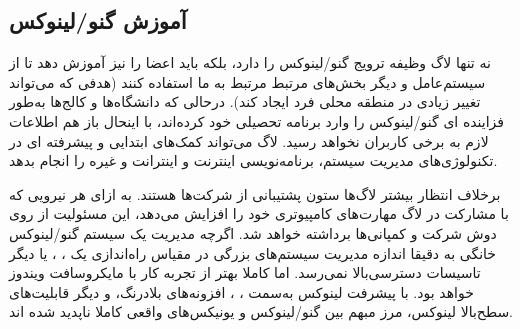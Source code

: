\subsection{آموزش گنو/لینوکس}

نه تنها لاگ وظیفه ترویج گنو/لینوکس را دارد، بلکه باید اعضا را نیز آموزش دهد
تا از سیستم‌عامل و دیگر بخش‌های مرتبط مرتبط به ما استفاده کنند (هدفی که می‌تواند
تغییر زیادی در منطقه محلی فرد ایجاد کند). 
درحالی که دانشگاه‌ها و کالج‌ها به‌طور فزاینده ای گنو/لینوکس را
وارد برنامه تحصیلی خود کرده‌اند، با اینحال باز هم اطلاعات لازم به برخی کاربران نخواهد رسید.
لاگ می‌تواند کمک‌های ابتدایی و پیشرفته ای در تکنولوژی‌های مدیریت سیستم، برنامه‌نویسی
اینترنت و اینترانت و غیره را انجام بدهد.

برخلاف انتظار بیشتر لاگ‌ها ستون پشتیبانی از شرکت‌ها هستند.
به ازای هر نیرویی که با مشارکت در لاگ مهارت‌های کامپیوتری خود را
افزایش می‌دهد، این مسئولیت از روی دوش شرکت و کمپانی‌ها برداشته خواهد شد.
اگرچه مدیریت یک سیستم گنو/لینوکس خانگی به دقیقا اندازه مدیریت سیستم‌های
بزرگی در مقیاس راه‌اندازی یک
،
،
یا دیگر تاسیسات دسترسی‌بالا نمی‌رسد. اما کاملا بهتر از تجربه کار با
مایکروسافت ویندوز خواهد بود.
با پیشرفت لینوکس به‌سمت
،
،
افزونه‌های بلادرنگ، و دیگر قابلیت‌های سطح‌بالا لینوکس،
مرز مبهم بین گنو/لینوکس و یونیکس‌های واقعی کاملا ناپدید شده اند.

